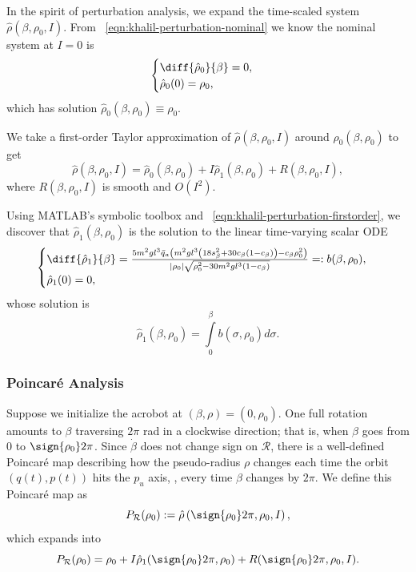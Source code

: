 In the spirit of perturbation analysis, we expand the time-scaled system 
\(\hat{\rho}(\beta,\rho_0,I)\). 
From ~\eqref{eqn:khalil-perturbation-nominal} we know the nominal system at
\(I = 0\) is
\[
    \begin{cases} 
        \diff{\hat{\rho}_0}{\beta} = 0
        , \\
        \hat{\rho}_0(0) = \rho_0
        ,
    \end{cases}
\]
which has solution \(\hat{\rho}_0(\beta,\rho_0) \equiv \rho_0\).

We take a first-order Taylor approximation of \(\hat{\rho}(\beta,\rho_0,I)\)
around \(\hat{\rho}_0(\beta,\rho_0)\) to get
\begin{equation}\label{eqn:acrobot-rhohat-approx}
    \hat{\rho}(\beta,\rho_0,I) = \hat{\rho}_0(\beta,\rho_0) +
    I\hat{\rho}_1(\beta,\rho_0) + R(\beta,\rho_0,I)
    ,
\end{equation}
where \(R(\beta,\rho_0,I)\) is smooth and \(O(I^2)\).

Using MATLAB's symbolic toolbox and 
~\eqref{eqn:khalil-perturbation-firstorder}, 
we discover that \(\hat{\rho}_1(\beta,\rho_0)\) is the solution to the linear
time-varying scalar ODE
\begin{equation}\label{eqn:acrobot-rho1-dot}
  \begin{cases}
      \diff{\hat{\rho}_1}{\beta} =
    \frac{5m^2 g l^3 \bar{q}_a \left(
        m^2gl^3\left(18s_\beta^2 + 30c_\beta(1 - c_\beta)\right)
        - c_\beta\rho_0^2
    \right)}{
    |\rho_0|\sqrt{\rho_0^2 - 30m^2gl^3(1 - c_\beta)}
    }
    =: b(\beta,\rho_0)
     , \\
     \hat{\rho}_1(0) = 0
     ,
 \end{cases}
\end{equation}
whose solution is
\[
    \hat{\rho}_1(\beta,\rho_0) = \int \limits_0^\beta b(\sigma,\rho_0)d\sigma
    .
\]

\subsubsection*{Poincar\'{e} Analysis}

Suppose we initialize the acrobot at \((\beta,\rho) = (0,\rho_0)\).
One full rotation amounts to \(\beta\) traversing \(2\pi\) rad in a clockwise
direction; that is, when \(\beta\) goes from \(0\) to \(\sign{\rho_0}2\pi\).
Since \(\dot{\beta}\) does not change sign on \(\mathcal{R}\),
there is a well-defined Poincar\'{e} map describing how the pseudo-radius
\(\rho\) changes each time the orbit \((q(t),p(t))\) hits the \(p_u\) axis, \ie,
every time \(\beta\) changes by \(2\pi\).
We define this Poincar\'{e} map as
\[
    P_\mathcal{R}(\rho_0) := \hat{\rho}\left(\sign{\rho_0}2\pi,\rho_0,I\right)
    ,
\]
which expands into
\[
    P_\mathcal{R}(\rho_0) = \rho_0 + I \hat{\rho}_1(\sign{\rho_0}2\pi, \rho_0)
    + R(\sign{\rho_0}2\pi,\rho_0,I)
    .
\]

